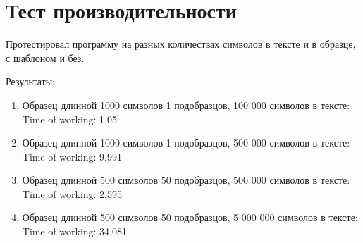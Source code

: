 \section{Тест производительности}
Протестировал программу на разных количествах символов в тексте и в образце, с шаблоном и без.

Результаты:
\begin{enumerate}
	\item Образец длинной 1000 символов 1 подобразцов, 100 000 символов в тексте:  \\ Time of working: 1.05
	\item  Образец длинной 1000 символов 1 подобразцов, 500 000 символов в тексте: \\ Time of working: 9.991
	\item Образец длинной 500 символов 50 подобразцов, 500 000 символов в тексте: \\ Time of working: 2.595
	\item Образец длинной 500 символов 50 подобразцов, 5 000 000 символов в тексте: \\ Time of working: 34.081
\end{enumerate}
\pagebreak

